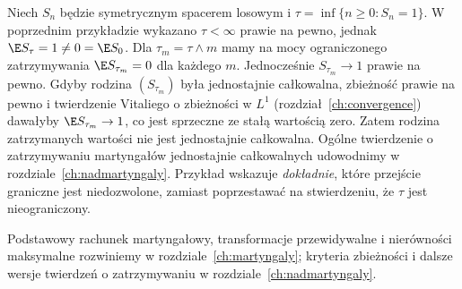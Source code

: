 \begin{uwaga}
Niech $S_n$ będzie symetrycznym spacerem losowym i
$\tau=\inf\{n\geq0:S_n=1\}$. W poprzednim przykładzie
wykazano $\tau<\infty$ prawie na pewno, jednak
$\E S_\tau=1\ne0=\E S_0$. Dla
$\tau_m=\tau\wedge m$ mamy na mocy ograniczonego
zatrzymywania $\E S_{\tau_m}=0$ dla każdego $m$.
Jednocześnie $S_{\tau_m}\to1$ prawie na pewno.
Gdyby rodzina $(S_{\tau_m})$ była jednostajnie
całkowalna, zbieżność prawie na pewno i twierdzenie
Vitaliego o zbieżności w $L^1$
(rozdział~\ref{ch:convergence}) dawałyby $\E S_{\tau_m}\to1$, co jest
sprzeczne ze stałą wartością zero.
Zatem rodzina zatrzymanych wartości nie jest
jednostajnie całkowalna. Ogólne twierdzenie
o zatrzymywaniu martyngałów jednostajnie całkowalnych
udowodnimy w rozdziale~\ref{ch:nadmartyngaly}. Przykład wskazuje
\emph{dokładnie}, które przejście graniczne jest
niedozwolone, zamiast poprzestawać na stwierdzeniu,
że $\tau$ jest nieograniczony.
\end{uwaga}


Podstawowy rachunek martyngałowy, transformacje
przewidywalne i nierówności maksymalne rozwiniemy
w rozdziale~\ref{ch:martyngaly}; kryteria zbieżności
i dalsze wersje twierdzeń o zatrzymywaniu
w rozdziale~\ref{ch:nadmartyngaly}.
